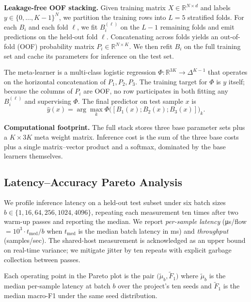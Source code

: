 \documentclass[conference]{IEEEtran}
\begin{document}
\textbf{Leakage-free OOF stacking.} Given training matrix $X \in
\mathbb{R}^{N \times d}$ and labels $y \in \{0,\ldots,K-1\}^N$, we
partition the training rows into $L = 5$ stratified folds. For each
$B_i$ and each fold $\ell$, we fit $B_i^{(\ell)}$ on the $L-1$ remaining
folds and emit predictions on the held-out fold $\ell$. Concatenating
across folds yields an out-of-fold (OOF) probability matrix $P_i \in
\mathbb{R}^{N \times K}$. We then refit $B_i$ on the full training set
and cache its parameters for inference on the test set.

The meta-learner is a multi-class logistic regression
$\Phi: \mathbb{R}^{3K} \to \Delta^{K-1}$ that operates on the horizontal
concatenation of $P_1, P_2, P_3$. The training target for $\Phi$ is
$y$ itself; because the columns of $P_i$ are OOF, no row participates in
both fitting any $B_i^{(\ell)}$ and supervising $\Phi$. The final
predictor on test sample $x$ is
\begin{equation}
\hat{y}(x) = \arg\max_k \Phi\bigl([B_1(x); B_2(x); B_3(x)]\bigr)_k.
\end{equation}

\textbf{Computational footprint.} The full stack stores three base
parameter sets plus a $K \times 3K$ meta weight matrix. Inference cost
is the sum of the three base costs plus a single matrix--vector product
and a softmax, dominated by the base learners themselves.

\subsection{Latency--Accuracy Pareto Analysis}

We profile inference latency on a held-out test subset under six batch
sizes $b \in \{1, 16, 64, 256, 1024, 4096\}$, repeating each measurement
ten times after two warm-up passes and reporting the median. We report
\emph{per-sample latency} (\si{\micro\second}/flow $= 10^3 \cdot
t_{\text{med}}/b$ when $t_{\text{med}}$ is the median batch latency in
ms) and \emph{throughput} (samples/sec). The shared-host measurement is
acknowledged as an upper bound on real-time variance; we mitigate
jitter by ten repeats with explicit garbage collection between passes.

Each operating point in the Pareto plot is the pair
$\bigl(\tilde{\mu}_b, \tilde{F}_1\bigr)$ where $\tilde{\mu}_b$ is the
median per-sample latency at batch $b$ over the project's ten seeds and
$\tilde{F}_1$ is the median macro-F1 under the same seed distribution.
\end{document}
